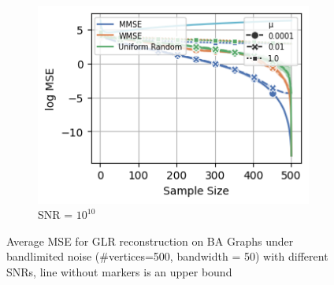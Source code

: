 \begin{figure}
\begin{subfigure}{0.3\columnwidth}
    \end{subfigure}\hfill%
    \begin{subfigure}{0.3\columnwidth}
    \includegraphics[width=\columnwidth]{figures/proj1/plots/GLR_MSE/BA_3_500_bandwidth_50_SNRdbs_100.0_samps_500_mus_0.0001_0.01_1_full_band.png}
    \caption{SNR = $10^{10}$}%
    \label{bandlimited_GLR_BA_MSE_subfigc}%
    \end{subfigure}%
    \caption{\color{black}Average MSE for GLR reconstruction on BA Graphs under bandlimited noise (\#vertices=500, bandwidth = 50) with different SNRs, line without markers is an upper bound}
\label{bandlimited_GLR_BA_MSE_fig}
\end{figure}




